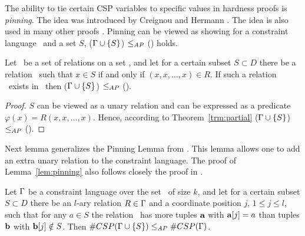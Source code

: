 The ability to tie certain CSP variables to specific values in hardness proofs is 
\emph{pinning}\@. The idea was introduced by Creignou and Hermann \cite{Nadia}. The idea
is also used in many other proofs \cite{bulatov07,Dyer,Trichotomy,madu}. Pinning can be
viewed as showing for a constraint language \mrelset\ and a set \(S\), 
\ccsp(\(\Gamma \cup \{{S}\}\)) \(\le_{AP}\) \ccsp(\mrelset) holds.

\begin{lemma}  \label{lem:refpin}
Let \mrelset\ be a set of relations on a set \mD, and let for a certain subset \(S \subset D\)
there be a relation \mR\ such that \(x\in S\) if and only if 
\((x,x,\dotsc,x)\in R\)\@. If such a relation \mR\ exists in \mrelset\ then
\ccsp(\(\Gamma \cup \{{S}\}\)) \(\le_{AP}\) \ccsp(\mrelset)\@.
\end{lemma}

\begin{proof}
\(S\) can be viewed as a unary relation and can be expressed as a predicate 
\(\varphi(x) = R(x,x,\dotsc,x)\)\@. Hence, according to Theorem~\ref{trm:partial}
\ccsp(\(\Gamma \cup \{{S}\}\)) \(\le_{AP}\) \ccsp(\mrelset)\@.
\end{proof}

Next lemma generalizes the Pinning Lemma from \cite{Trichotomy}.
This lemma allows one to add an extra unary relation to the constraint language. 
The proof of Lemma~\ref{lem:pinning} also follows closely the proof in \cite{Trichotomy}. 

\begin{lemma}\label{lem:pinning}
Let \(\Gamma\) be a constraint language over the set \mD\ of size \(k\)\@,
and let for a certain subset \(S \subset D\) 
there be an \(l\)-ary relation \(R \in \Gamma\) and a coordinate position \(j\),
\(1 \le j \le l\), such that for any \(a\in S\) the relation \mR\ has more tuples
\(\textbf{a}\) with \(\textbf{a}[j]=a\) than tuples \(\textbf{b}\) with
\(\textbf{b}[j] \notin S\)\@. Then \(\#CSP(\Gamma \cup \{{S}\}) \le_{AP} \#CSP(\Gamma)\)\@.
\end{lemma}

